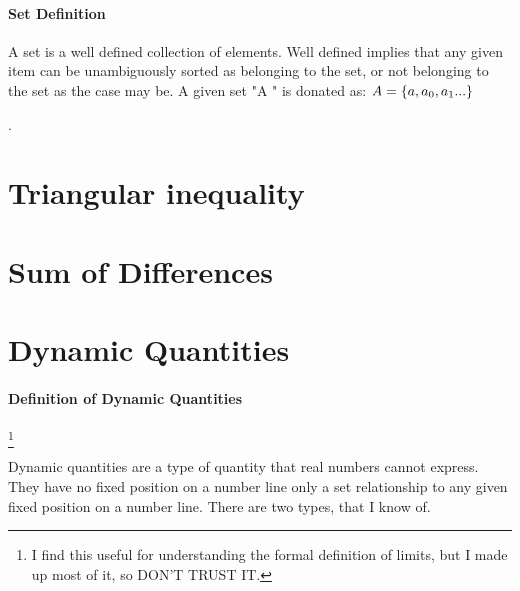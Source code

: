\documentclass[12pt, a4paper,oneside]{book}
\begin{document}
			\paragraph{Set Definition}
				\begin{paragraph}
					A set is a well defined collection of elements. Well defined implies that 								any given item can be unambiguously sorted as belonging to the set, or 									not belonging to the set as the case may be. A given set "A " is 										donated as: \(\boldmath{A}=\{a, a_0, a_1 ...\}\)
			    \end{paragraph}.		
		
      \section{Triangular inequality}
		
      \section{ Sum of Differences}
		
      \section{Dynamic Quantities}
		
        \paragraph{Definition of Dynamic Quantities} 
           
           \footnote{I find this useful for understanding the formal definition of 										limits, but I made up most of it, so DON'T TRUST IT.}

			\begin{paragraph} Dynamic quantities are a type of quantity that real numbers 								cannot express. They have no fixed position on a number line only a set 								relationship to any given fixed position on a number line. There are two 								types, that I know of.
			\end{paragraph}
	
\end{document}

